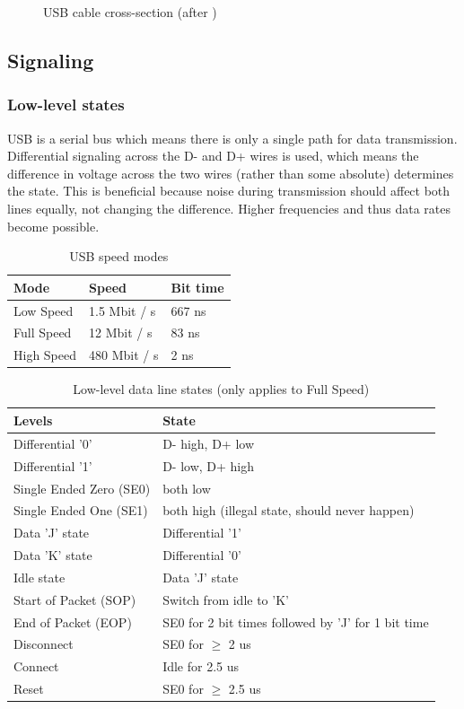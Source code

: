 \documentclass{article}
\begin{document}
\begin{figure}[H]
  \caption{USB cable cross-section (after \cite[p. 17]{usbstd})}
  \centering
  \scalebox{2}{}
\end{figure}

\subsection{Signaling}

\subsubsection{Low-level states}

USB is a serial bus which means there is only a single path for data transmission.
Differential signaling across the D- and D+ wires is used, which means the difference in voltage
across the two wires (rather than some absolute) determines the state. This is beneficial because
noise during transmission should affect both lines equally, not changing the difference.
Higher frequencies and thus data rates become possible.

\begin{table}[H]
  \caption{USB speed modes \cite[p. 159]{usbstd}}
  \centering
  \begin{tabular}{l | l | l}
    Mode & Speed & Bit time \\ \hline
    Low Speed & 1.5 Mbit / s & 667 ns \\
    Full Speed & 12 Mbit / s & 83 ns \\
    High Speed & 480 Mbit / s & 2 ns \\
  \end{tabular}
\end{table}

\begin{table}[H]
  \caption{Low-level data line states (only applies to Full Speed) \cite[p. 145]{usbstd}}
  \centering
  \begin{tabularx}{\textwidth}{l | X}
    Levels & State \\ \hline
    Differential '0' & D- high, D+ low \\
    Differential '1' & D- low, D+ high \\
    Single Ended Zero (SE0) & both low \\
    Single Ended One (SE1) & both high (illegal state, should never happen) \\
    Data 'J' state & Differential '1' \\
    Data 'K' state & Differential '0' \\
    Idle state & Data 'J' state \\
    Start of Packet (SOP) & Switch from idle to 'K' \\
    End of Packet (EOP) & SE0 for 2 bit times followed by 'J' for 1 bit time \\
    Disconnect & SE0 for $\geq$ 2 us \\
    Connect & Idle for 2.5 us \\
    Reset & SE0 for $\geq$ 2.5 us \\
  \end{tabularx}
\end{table}
\end{document}
